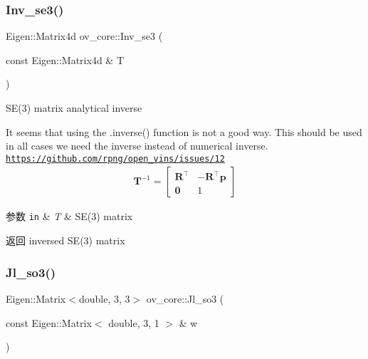 \subsubsection{\texorpdfstring{Inv\+\_\+se3()}{Inv\_se3()}}
{\footnotesize\ttfamily Eigen\+::\+Matrix4d ov\+\_\+core\+::\+Inv\+\_\+se3 (\begin{DoxyParamCaption}\item[{const Eigen\+::\+Matrix4d \&}]{T }\end{DoxyParamCaption})\hspace{0.3cm}{\ttfamily [inline]}}



S\+E(3) matrix analytical inverse 

It seems that using the .inverse() function is not a good way. This should be used in all cases we need the inverse instead of numerical inverse. \href{https://github.com/rpng/open_vins/issues/12}{\tt https\+://github.\+com/rpng/open\+\_\+vins/issues/12} \begin{align*} \mathbf{T}^{-1} = \begin{bmatrix} \mathbf{R}^\top & -\mathbf{R}^\top\mathbf{p} \\ \mathbf{0} & 1 \end{bmatrix} \end{align*}


\begin{DoxyParams}[1]{参数}
\mbox{\tt in}  & {\em T} & S\+E(3) matrix \\
\hline
\end{DoxyParams}
\begin{DoxyReturn}{返回}
inversed S\+E(3) matrix 
\end{DoxyReturn}
\mbox{\label{namespaceov__core_a518b7324a4106ccad60558e2e5c4b14f}} 
\subsubsection{\texorpdfstring{Jl\+\_\+so3()}{Jl\_so3()}}
{\footnotesize\ttfamily Eigen\+::\+Matrix$<$double, 3, 3$>$ ov\+\_\+core\+::\+Jl\+\_\+so3 (\begin{DoxyParamCaption}\item[{const Eigen\+::\+Matrix$<$ double, 3, 1 $>$ \&}]{w }\end{DoxyParamCaption})\hspace{0.3cm}{\ttfamily [inline]}}



